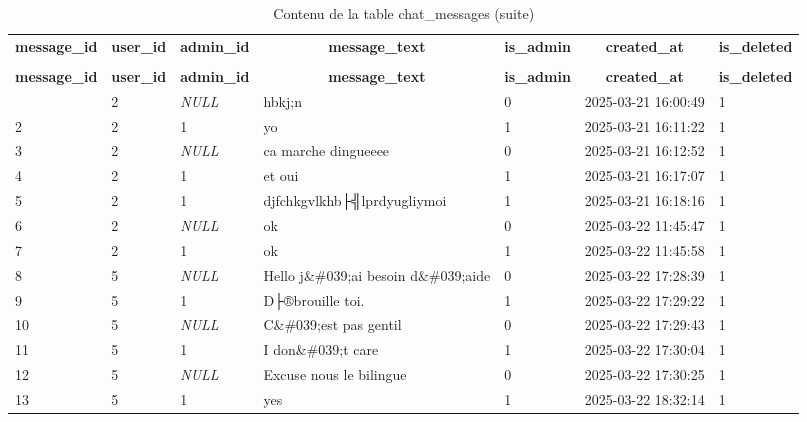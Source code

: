 %
%
 \begin{longtable}{|l|l|l|l|l|l|l|} 
 \hline \endhead \hline \endfoot \hline 
 \caption{Contenu de la table chat\_messages} \label{tab:chat_messages-data} \\\hline \multicolumn{1}{|c|}{\textbf{message\_id}} & \multicolumn{1}{|c|}{\textbf{user\_id}} & \multicolumn{1}{|c|}{\textbf{admin\_id}} & \multicolumn{1}{|c|}{\textbf{message\_text}} & \multicolumn{1}{|c|}{\textbf{is\_admin}} & \multicolumn{1}{|c|}{\textbf{created\_at}} & \multicolumn{1}{|c|}{\textbf{is\_deleted}} \\ \hline \hline  \endfirsthead 
\caption{Contenu de la table chat\_messages (suite)} \\ \hline \multicolumn{1}{|c|}{\textbf{message\_id}} & \multicolumn{1}{|c|}{\textbf{user\_id}} & \multicolumn{1}{|c|}{\textbf{admin\_id}} & \multicolumn{1}{|c|}{\textbf{message\_text}} & \multicolumn{1}{|c|}{\textbf{is\_admin}} & \multicolumn{1}{|c|}{\textbf{created\_at}} & \multicolumn{1}{|c|}{\textbf{is\_deleted}} \\ \hline \hline \endhead \endfoot
1 & 2 & \textit{NULL} & hbkj;n & 0 & 2025-03-21 16:00:49 & 1 \\ \hline 
2 & 2 & 1 & yo & 1 & 2025-03-21 16:11:22 & 1 \\ \hline 
3 & 2 & \textit{NULL} & ca marche dingueeee & 0 & 2025-03-21 16:12:52 & 1 \\ \hline 
4 & 2 & 1 & et oui & 1 & 2025-03-21 16:17:07 & 1 \\ \hline 
5 & 2 & 1 & djfchkgvlkhb├╣lprdyugliymoi & 1 & 2025-03-21 16:18:16 & 1 \\ \hline 
6 & 2 & \textit{NULL} & ok & 0 & 2025-03-22 11:45:47 & 1 \\ \hline 
7 & 2 & 1 & ok & 1 & 2025-03-22 11:45:58 & 1 \\ \hline 
8 & 5 & \textit{NULL} & Hello j\&\#039;ai besoin d\&\#039;aide & 0 & 2025-03-22 17:28:39 & 1 \\ \hline 
9 & 5 & 1 & D├®brouille toi. & 1 & 2025-03-22 17:29:22 & 1 \\ \hline 
10 & 5 & \textit{NULL} & C\&\#039;est pas gentil & 0 & 2025-03-22 17:29:43 & 1 \\ \hline 
11 & 5 & 1 & I don\&\#039;t care & 1 & 2025-03-22 17:30:04 & 1 \\ \hline 
12 & 5 & \textit{NULL} & Excuse nous le bilingue & 0 & 2025-03-22 17:30:25 & 1 \\ \hline 
13 & 5 & 1 & yes & 1 & 2025-03-22 18:32:14 & 1 \\ \hline 

\end{longtable}
